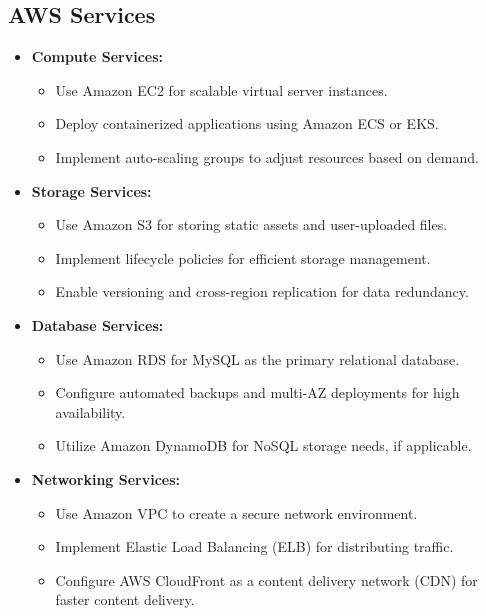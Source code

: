 \subsection{AWS Services}
\begin{itemize}[leftmargin=*]
    \item \textbf{Compute Services:}
    \begin{itemize}
        \item Use Amazon EC2 for scalable virtual server instances.
        \item Deploy containerized applications using Amazon ECS or EKS.
        \item Implement auto-scaling groups to adjust resources based on demand.
    \end{itemize}
    
    \item \textbf{Storage Services:}
    \begin{itemize}
        \item Use Amazon S3 for storing static assets and user-uploaded files.
        \item Implement lifecycle policies for efficient storage management.
        \item Enable versioning and cross-region replication for data redundancy.
    \end{itemize}
    
    \item \textbf{Database Services:}
    \begin{itemize}
        \item Use Amazon RDS for MySQL as the primary relational database.
        \item Configure automated backups and multi-AZ deployments for high availability.
        \item Utilize Amazon DynamoDB for NoSQL storage needs, if applicable.
    \end{itemize}
    
    \item \textbf{Networking Services:}
    \begin{itemize}
        \item Use Amazon VPC to create a secure network environment.
        \item Implement Elastic Load Balancing (ELB) for distributing traffic.
        \item Configure AWS CloudFront as a content delivery network (CDN) for faster content delivery.
    \end{itemize}
\end{itemize}

